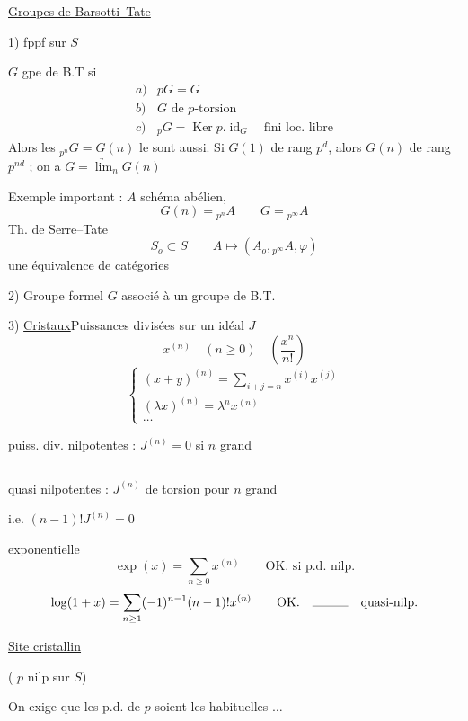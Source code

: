 \uline{Groupes de Barsotti--Tate}

1) fppf sur $S$

$G$ gpe de B.T si
\[
\begin{array}{ll}
a)&pG=G\\
b)&G\text{ de $p$-torsion}\\
c)&{}_pG=\operatorname{Ker}p.\operatorname{id}_G\quad\text{fini loc. libre}
\end{array}
\]
Alors les ${}_{p^n}G=G(n)$ le sont aussi. Si $G(1)$ de rang $p^d$, alors $G(n)$ de rang $p^{nd}$ ; on a $G=\underrightarrow{\lim}_nG(n)$

Exemple important : $A$ schéma abélien,
\[
G(n)={}_{p^n}A\qquad G={}_{p^\infty}A
\]
 Th. de Serre--Tate
\[
S_o\subset S\qquad A\longmapsto(A_o,{}_{p^\infty}A,\varphi)
\]
une équivalence de catégories

2) Groupe formel $\bar G$ associé à un groupe de B.T.

3) \uline{Cristaux}\qquad Puissances divisées sur un idéal $J$
\[
x^{(n)}\quad(n\geq0)\quad\left(\frac{x^n}{n!}\right)
\]
\[
\left\{\begin{array}{l}
(x+y)^{(n)}=\displaystyle\sum_{i+j=n}x^{(i)}x^{(j)}\\[1em]
(\lambda x)^{(n)}=\lambda^n x^{(n)}\\[2em]
\ldots
\end{array}\right.
\]


puiss. div. nilpotentes : $J^{(n)}=0$ si $n$ grand

\rule{2cm}{.3pt} quasi nilpotentes : $J^{(n)}$ de torsion pour $n$ grand

i.e. $(n-1)!J^{(n)}=0$

exponentielle
\[
\exp(x)=\sum_{n\geq0}x^{(n)}\qquad\text{OK. si p.d. nilp.}
\]
\[
\log(1+x)=\sum_{n\geq1}(-1)^{n-1}(n-1)!x^{(n)}\qquad\text{OK.}\quad\rule{1cm}{.3pt}\quad\text{quasi-nilp.}
\]

\uline{Site cristallin}  \quad{}

 ( $p$ nilp sur $S$)

On exige que les p.d. de $p$ soient les habituelles $\ldots$
